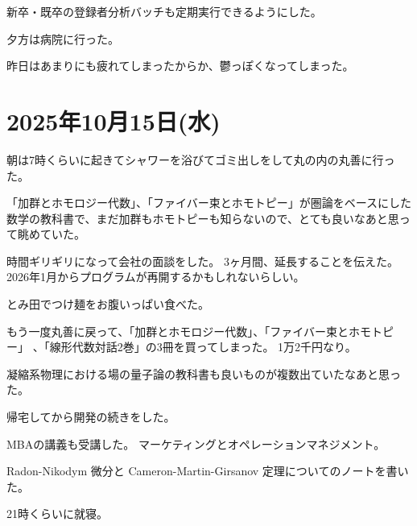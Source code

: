 \documentclass[uplatex]{jsarticle}
\begin{document}
新卒・既卒の登録者分析バッチも定期実行できるようにした。

夕方は病院に行った。

昨日はあまりにも疲れてしまったからか、鬱っぽくなってしまった。


\section{2025年10月15日(水)}

朝は7時くらいに起きてシャワーを浴びてゴミ出しをして丸の内の丸善に行った。

「加群とホモロジー代数」、「ファイバー束とホモトピー」が圏論をベースにした数学の教科書で、まだ加群もホモトピーも知らないので、とても良いなあと思って眺めていた。

時間ギリギリになって会社の面談をした。
3ヶ月間、延長することを伝えた。
2026年1月からプログラムが再開するかもしれないらしい。

とみ田でつけ麺をお腹いっぱい食べた。

もう一度丸善に戻って、「加群とホモロジー代数」、「ファイバー束とホモトピー」 、「線形代数対話2巻」の3冊を買ってしまった。
1万2千円なり。

凝縮系物理における場の量子論の教科書も良いものが複数出ていたなあと思った。

帰宅してから開発の続きをした。

MBAの講義も受講した。
マーケティングとオペレーションマネジメント。

Radon-Nikodym 微分と Cameron-Martin-Girsanov 定理についてのノートを書いた。

21時くらいに就寝。
\end{document}
